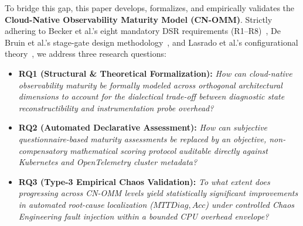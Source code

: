 To bridge this gap, this paper develops, formalizes, and empirically validates the \textbf{Cloud-Native Observability Maturity Model (CN-OMM)}. Strictly adhering to Becker et al.'s eight mandatory DSR requirements (R1--R8)~\cite{becker_2009}, De Bruin et al.'s stage-gate design methodology~\cite{debruin_2005}, and Lasrado et al.'s configurational theory~\cite{lasrado_2015}, we address three research questions:
\begin{itemize}[leftmargin=*, nosep]
    \item \textbf{RQ1 (Structural \& Theoretical Formalization):} \textit{How can cloud-native observability maturity be formally modeled across orthogonal architectural dimensions to account for the dialectical trade-off between diagnostic state reconstructibility and instrumentation probe overhead?}
    \item \textbf{RQ2 (Automated Declarative Assessment):} \textit{How can subjective questionnaire-based maturity assessments be replaced by an objective, non-compensatory mathematical scoring protocol auditable directly against Kubernetes and OpenTelemetry cluster metadata?}
    \item \textbf{RQ3 (Type-3 Empirical Chaos Validation):} \textit{To what extent does progressing across CN-OMM levels yield statistically significant improvements in automated root-cause localization ($MTTDiag, Acc$) under controlled Chaos Engineering fault injection within a bounded CPU overhead envelope?}
\end{itemize}

